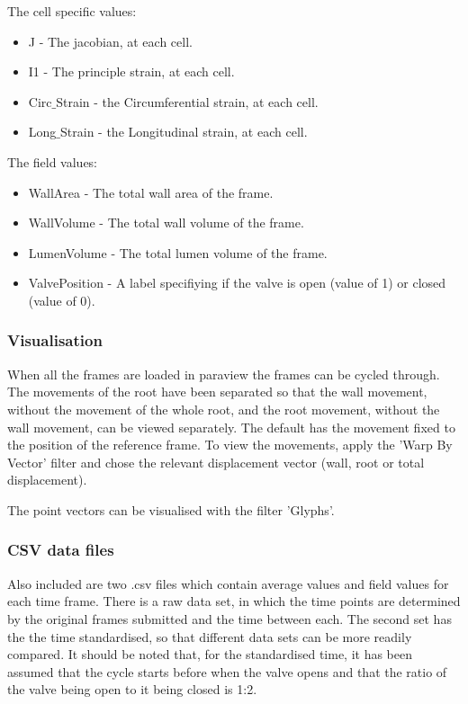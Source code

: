 \documentclass{article}
\begin{document}
The cell specific values:
\begin{itemize}
    \item J - The jacobian, at each cell.
    \item I1 - The principle strain, at each cell.
    \item Circ$\_$Strain - the Circumferential strain, at each cell.
    \item Long$\_$Strain - the Longitudinal strain, at each cell.
\end{itemize}
The field values:
\begin{itemize}
    \item WallArea - The total wall area of the frame.
    \item WallVolume - The total wall volume of the frame.
    \item LumenVolume - The total lumen volume of the frame.
    \item ValvePosition - A label specifiying if the valve is open (value of 1) or closed (value of 0).
\end{itemize}
\subsubsection*{Visualisation}
When all the frames are loaded in paraview the frames can be cycled through. The movements of the root have been separated so that the wall movement, without the movement of the whole root, and the root movement, without the wall movement, can be viewed separately. The default has the movement fixed to the position of the reference frame. To view the movements, apply the 'Warp By Vector' filter and chose the relevant displacement vector (wall, root or total displacement).

The point vectors can be visualised with the filter 'Glyphs'.

\subsubsection*{CSV data files}
Also included are two .csv files which contain average values and field values for each time frame. There is a raw data set, in which the time points are determined by the original frames submitted and the time between each. The second set has the the time standardised, so that different data sets can be more readily compared. It should be noted that, for the standardised time, it has been assumed that the cycle starts before when the valve opens and that the ratio of the valve being open to it being closed is 1:2.
\end{document}

